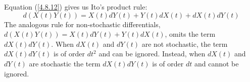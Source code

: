 \documentclass[\topdir/lecture\_notes.tex]{subfiles}
\begin{document}
Equation (\ref{4.8.12}) gives us Ito's product rule:
\begin{equation*}
d(X(t) Y(t))=X(t) d Y(t)+Y(t) d X(t)+d X(t) d Y(t)
\end{equation*}
The analogous rule for non-stochastic differentials, $d(X(t) Y(t))=X(t) d Y(t)+Y(t) d X(t)$, omits the term $dX(t) dY(t)$. When $dX(t)$ and $dY(t)$ are not stochastic, the term $dX(t) dY(t)$ is of order $dt^2$ and can be ignored. Instead, when $dX(t)$ and $dY(t)$ are stochastic the term $dX(t) dY(t)$ is of order $dt$ and cannot be ignored.





\end{document}
